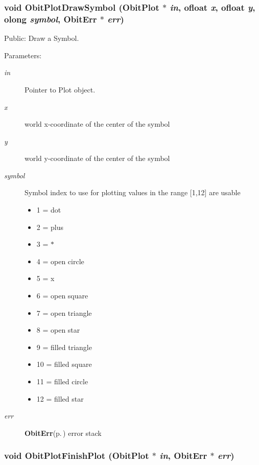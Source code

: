 \subsubsection{\setlength{\rightskip}{0pt plus 5cm}void Obit\-Plot\-Draw\-Symbol ({\bf Obit\-Plot} $\ast$ {\em in}, {\bf ofloat} {\em x}, {\bf ofloat} {\em y}, {\bf olong} {\em symbol}, {\bf Obit\-Err} $\ast$ {\em err})}\label{ObitPlot_8h_a27}


Public: Draw a Symbol. 

\begin{Desc}
\item[Parameters:]
\begin{description}
\item[{\em in}]Pointer to Plot object. \item[{\em x}]world x-coordinate of the center of the symbol \item[{\em y}]world y-coordinate of the center of the symbol \item[{\em symbol}]Symbol index to use for plotting values in the range [1,12] are usable \begin{itemize}
\item 1 = dot \item 2 = plus \item 3 = $\ast$ \item 4 = open circle \item 5 = x \item 6 = open square \item 7 = open triangle \item 8 = open star \item 9 = filled triangle \item 10 = filled square \item 11 = filled circle \item 12 = filled star \end{itemize}
\item[{\em err}]{\bf Obit\-Err}{\rm (p.\,\pageref{structObitErr})} error stack \end{description}
\end{Desc}
\subsubsection{\setlength{\rightskip}{0pt plus 5cm}void Obit\-Plot\-Finish\-Plot ({\bf Obit\-Plot} $\ast$ {\em in}, {\bf Obit\-Err} $\ast$ {\em err})}\label{ObitPlot_8h_a6}


